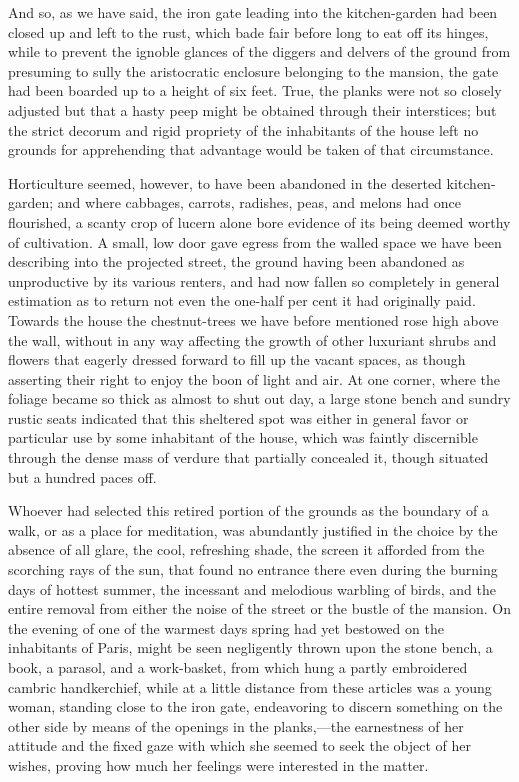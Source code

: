 And so, as we have said, the iron gate leading into the kitchen-garden
had been closed up and left to the rust, which bade fair before long to
eat off its hinges, while to prevent the ignoble glances of the diggers
and delvers of the ground from presuming to sully the aristocratic
enclosure belonging to the mansion, the gate had been boarded up to a
height of six feet. True, the planks were not so closely adjusted but
that a hasty peep might be obtained through their interstices; but the
strict decorum and rigid propriety of the inhabitants of the house left
no grounds for apprehending that advantage would be taken of that
circumstance.

Horticulture seemed, however, to have been abandoned in the deserted
kitchen-garden; and where cabbages, carrots, radishes, peas, and melons
had once flourished, a scanty crop of lucern alone bore evidence of its
being deemed worthy of cultivation. A small, low door gave egress from
the walled space we have been describing into the projected street, the
ground having been abandoned as unproductive by its various renters,
and had now fallen so completely in general estimation as to return not
even the one-half per cent it had originally paid. Towards the house
the chestnut-trees we have before mentioned rose high above the wall,
without in any way affecting the growth of other luxuriant shrubs and
flowers that eagerly dressed forward to fill up the vacant spaces, as
though asserting their right to enjoy the boon of light and air. At one
corner, where the foliage became so thick as almost to shut out day, a
large stone bench and sundry rustic seats indicated that this sheltered
spot was either in general favor or particular use by some inhabitant
of the house, which was faintly discernible through the dense mass of
verdure that partially concealed it, though situated but a hundred
paces off.

Whoever had selected this retired portion of the grounds as the
boundary of a walk, or as a place for meditation, was abundantly
justified in the choice by the absence of all glare, the cool,
refreshing shade, the screen it afforded from the scorching rays of the
sun, that found no entrance there even during the burning days of
hottest summer, the incessant and melodious warbling of birds, and the
entire removal from either the noise of the street or the bustle of the
mansion. On the evening of one of the warmest days spring had yet
bestowed on the inhabitants of Paris, might be seen negligently thrown
upon the stone bench, a book, a parasol, and a work-basket, from which
hung a partly embroidered cambric handkerchief, while at a little
distance from these articles was a young woman, standing close to the
iron gate, endeavoring to discern something on the other side by means
of the openings in the planks,—the earnestness of her attitude and the
fixed gaze with which she seemed to seek the object of her wishes,
proving how much her feelings were interested in the matter.

